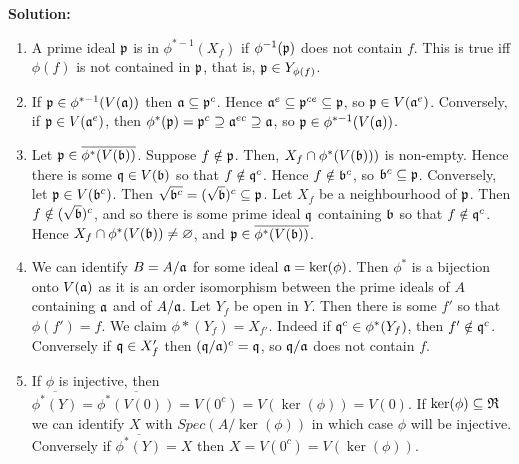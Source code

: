 \documentclass{article}
\begin{document}
\noindent\textbf{Solution:}
\begin{enumerate}
    \item
        A prime ideal \(\mathfrak{p}\) is in \(\phi^{*-1}(X_f)\) if \(\phi^{-1}(\mathfrak{p})\) does not contain \(f\).
        This is true iff \(\phi(f)\) is not contained in \(\mathfrak{p}\), that is, \(\mathfrak{p} \in Y_{\phi(f)}\).
    \item
        If \(\mathfrak{p} \in \phi^{*-1}(V(\mathfrak{a}))\) then \(\mathfrak{a} \subseteq \mathfrak{p}^c\).
        Hence \(\mathfrak{a}^e \subseteq \mathfrak{p}^{ce} \subseteq \mathfrak{p}\), so \(\mathfrak{p} \in V(\mathfrak{a}^e)\).
        Conversely, if \(\mathfrak{p} \in V(\mathfrak{a}^e)\), then \(\phi^*(\mathfrak{p}) = \mathfrak{p}^c \supseteq \mathfrak{a}^{ec} \supseteq \mathfrak{a}\), so \(\mathfrak{p} \in \phi^{*-1}(V(\mathfrak{a}))\).
    \item
        Let \(\mathfrak{p} \in \overline{\phi^*(V(\mathfrak{b}))}\).
        Suppose \(f \notin \mathfrak{p}\).
        Then, \(X_f \cap \phi^*(V(\mathfrak{b})))\) is non-empty.
        Hence there is some \(\mathfrak{q} \in V(\mathfrak{b})\) so that \(f \notin \mathfrak{q}^c\).
        Hence \(f \notin \mathfrak{b}^c\), so \(\mathfrak{b}^c \subseteq \mathfrak{p}\).
        Conversely, let \(\mathfrak{p} \in V(\mathfrak{b}^c)\).
        Then \(\sqrt{\mathfrak{b}^c} = (\sqrt{\mathfrak{b}})^c \subseteq \mathfrak{p}\).
        Let \(X_f\) be a neighbourhood of \(\mathfrak{p}\).
        Then \(f \notin (\sqrt{\mathfrak{b}})^c\), and so there is some prime ideal \(\mathfrak{q}\) containing \(\mathfrak{b}\) so that \(f \notin \mathfrak{q}^c\).
        Hence \(X_f \cap \phi^*(V(\mathfrak{b})) \neq \varnothing\), and \(\mathfrak{p} \in \overline{\phi^*(V(\mathfrak{b}))}\).
    \item
        We can identify \(B = A/\mathfrak{a}\) for some ideal \(\mathfrak{a} = \ker(\phi)\).
        Then \(\phi^*\) is a bijection onto \(V(\mathfrak{a})\) as it is an order isomorphism between the prime ideals of \(A\) containing \(\mathfrak{a}\) and of \(A/\mathfrak{a}\).
        Let \(Y_f\) be open in \(Y\).
        Then there is some \(f'\) so that \(\phi(f') = f\).
        We claim \(\phi*(Y_f) = X_{f'}\).
        Indeed if \(\mathfrak{q}^c \in \phi^*(Y_f)\), then \(f' \notin \mathfrak{q}^c\).
        Conversely if \(\mathfrak{q} \in X_f'\) then \((\mathfrak{q} / \mathfrak{a})^c = \mathfrak{q}\), so \(\mathfrak{q} / \mathfrak{a}\) does not contain \(f\).
    \item
        If \(\phi\) is injective, then \(\overline{\phi^*(Y)} = \overline{\phi^*(V(0))} = V(0^c) = V(\ker(\phi)) = V(0)\).
        If \(\ker(\phi) \subseteq \mathfrak{R}\) we can identify \(X\) with \(Spec(A/\ker(\phi))\) in which case \(\phi\) will be injective.
        Conversely if \(\overline{\phi^*(Y)} = X\) then \(X = V(0^c) = V(\ker(\phi))\).

\end{enumerate}
\end{document}
